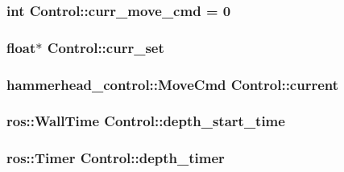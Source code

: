\subsubsection[{\texorpdfstring{curr\+\_\+move\+\_\+cmd}{curr_move_cmd}}]{\setlength{\rightskip}{0pt plus 5cm}int Control\+::curr\+\_\+move\+\_\+cmd = 0\hspace{0.3cm}{\ttfamily [private]}}\hypertarget{classControl_a6b9bafba66e817433e5fe291dd603518}{}\label{classControl_a6b9bafba66e817433e5fe291dd603518}
\subsubsection[{\texorpdfstring{curr\+\_\+set}{curr_set}}]{\setlength{\rightskip}{0pt plus 5cm}float$\ast$ Control\+::curr\+\_\+set\hspace{0.3cm}{\ttfamily [private]}}\hypertarget{classControl_a42067224edcba565aa68d4bf087e45e8}{}\label{classControl_a42067224edcba565aa68d4bf087e45e8}
\subsubsection[{\texorpdfstring{current}{current}}]{\setlength{\rightskip}{0pt plus 5cm}hammerhead\+\_\+control\+::\+Move\+Cmd Control\+::current\hspace{0.3cm}{\ttfamily [private]}}\hypertarget{classControl_af74f0b009e6e0835715c5c84e5e9fdd5}{}\label{classControl_af74f0b009e6e0835715c5c84e5e9fdd5}
\subsubsection[{\texorpdfstring{depth\+\_\+start\+\_\+time}{depth_start_time}}]{\setlength{\rightskip}{0pt plus 5cm}ros\+::\+Wall\+Time Control\+::depth\+\_\+start\+\_\+time\hspace{0.3cm}{\ttfamily [private]}}\hypertarget{classControl_af1c6dd9d0fe3364d6104754e251de910}{}\label{classControl_af1c6dd9d0fe3364d6104754e251de910}
\subsubsection[{\texorpdfstring{depth\+\_\+timer}{depth_timer}}]{\setlength{\rightskip}{0pt plus 5cm}ros\+::\+Timer Control\+::depth\+\_\+timer\hspace{0.3cm}{\ttfamily [private]}}\hypertarget{classControl_a2fb8968d2bdfa14be8d7c6a1931ac3ad}{}\label{classControl_a2fb8968d2bdfa14be8d7c6a1931ac3ad}
